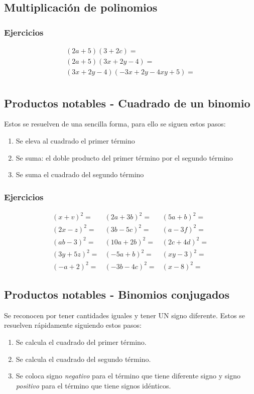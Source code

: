 \subsection{Multiplicación de polinomios}
\subsubsection{Ejercicios}
$$
\begin{array}{l}
(2a+5)(3+2c)=\\
(2a+5)(3x+2y-4)=\\
(3x+2y-4)(-3x+2y-4xy+5)=\\
\end{array}
$$

\subsection{Productos notables - Cuadrado de un binomio}
Estos se resuelven de una sencilla forma, para ello se siguen estos pasos:
\begin{enumerate}
\item Se eleva al cuadrado el primer término
\item Se suma: el doble producto del primer término por el segundo término
\item Se suma el cuadrado del segundo término
\end{enumerate}

\subsubsection{Ejercicios}
$$
\begin{array}{l|l|l}
(x+v)^2=   & (2a+3b)^2=   & (5a+b)^2=\\
(2x-z)^2=  & (3b - 5c)^2= & (a-3f)^2=\\
(ab-3)^2=  & (10a+2b)^2=  & (2c+4d)^2=\\
(3y+5z)^2= & (-5a+b)^2=   & (xy-3)^2=\\
(-a+2)^2=  & (-3b-4c)^2=  & (x-8)^2=
\end{array}
$$

\subsection{Productos notables - Binomios conjugados}
Se reconocen por tener cantidades iguales y tener UN signo diferente.
Estos se resuelven rápidamente siguiendo estos pasos:
\begin{enumerate}
\item Se calcula el cuadrado del primer término.
\item Se calcula el cuadrado del segundo término.
\item Se coloca signo \emph{negativo} para el término que tiene diferente signo y signo \emph{positivo} para el término que tiene signos idénticos.
\end{enumerate}

